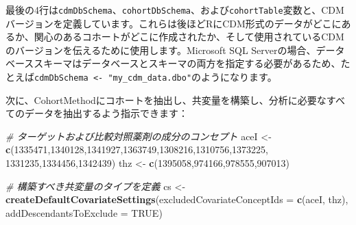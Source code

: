 \documentclass[
  11pt]{book}
\newenvironment{Shaded}{\begin{snugshade}}{\end{snugshade}}
\newcommand{\AttributeTok}[1]{\textcolor[rgb]{0.13,0.29,0.53}{#1}}
\newcommand{\CommentTok}[1]{\textcolor[rgb]{0.56,0.35,0.01}{\textit{#1}}}
\newcommand{\ConstantTok}[1]{\textcolor[rgb]{0.56,0.35,0.01}{#1}}
\newcommand{\DecValTok}[1]{\textcolor[rgb]{0.00,0.00,0.81}{#1}}
\newcommand{\FunctionTok}[1]{\textcolor[rgb]{0.13,0.29,0.53}{\textbf{#1}}}
\newcommand{\NormalTok}[1]{#1}
\newcommand{\OtherTok}[1]{\textcolor[rgb]{0.56,0.35,0.01}{#1}}
\theoremstyle{definition}
\theoremstyle{definition}
\theoremstyle{definition}
\theoremstyle{definition}
\theoremstyle{remark}
\begin{document}
最後の4行は\texttt{cdmDbSchema}、\texttt{cohortDbSchema}、および\texttt{cohortTable}変数と、CDMバージョンを定義しています。これらは後ほどRにCDM形式のデータがどこにあるか、関心のあるコホートがどこに作成されたか、そして使用されているCDMのバージョンを伝えるために使用します。Microsoft SQL Serverの場合、データベーススキーマはデータベースとスキーマの両方を指定する必要があるため、たとえば\texttt{cdmDbSchema\ \textless{}-\ "my\_cdm\_data.dbo"}のようになります。

次に、CohortMethodにコホートを抽出し、共変量を構築し、分析に必要なすべてのデータを抽出するよう指示できます：

\begin{Shaded}
\begin{Highlighting}[]
\CommentTok{\# ターゲットおよび比較対照薬剤の成分のコンセプト}
\NormalTok{aceI }\OtherTok{\textless{}{-}} \FunctionTok{c}\NormalTok{(}\DecValTok{1335471}\NormalTok{,}\DecValTok{1340128}\NormalTok{,}\DecValTok{1341927}\NormalTok{,}\DecValTok{1363749}\NormalTok{,}\DecValTok{1308216}\NormalTok{,}\DecValTok{1310756}\NormalTok{,}\DecValTok{1373225}\NormalTok{,}
          \DecValTok{1331235}\NormalTok{,}\DecValTok{1334456}\NormalTok{,}\DecValTok{1342439}\NormalTok{)}
\NormalTok{thz }\OtherTok{\textless{}{-}} \FunctionTok{c}\NormalTok{(}\DecValTok{1395058}\NormalTok{,}\DecValTok{974166}\NormalTok{,}\DecValTok{978555}\NormalTok{,}\DecValTok{907013}\NormalTok{)}

\CommentTok{\# 構築すべき共変量のタイプを定義}
\NormalTok{cs }\OtherTok{\textless{}{-}} \FunctionTok{createDefaultCovariateSettings}\NormalTok{(}\AttributeTok{excludedCovariateConceptIds =} \FunctionTok{c}\NormalTok{(aceI,}
\NormalTok{                                                                     thz),}
                                     \AttributeTok{addDescendantsToExclude =} \ConstantTok{TRUE}\NormalTok{)}


\end{Highlighting}
\end{Shaded}
\end{document}
